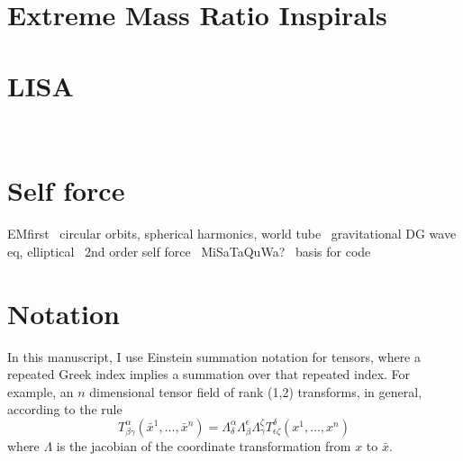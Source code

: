 




\section{Extreme Mass Ratio Inspirals}
\section{LISA}
~\cite{LISA02062017}
~\cite{LISAscienceMarch28_2017}
~\cite{ELISAz}
~\cite{eLISAastrophysicsSelfForce}
\section{Self force}
EMfirst~\cite{dirac1938}
circular orbits, spherical harmonics, world tube~\cite{wardell_vega_thornberg_diener}
gravitational DG wave eq, elliptical~\cite{time_dependent_coordinate_transform}
2nd order self force~\cite{pound2ndOrderSelfForce0}
MiSaTaQuWa?~\cite{minosasakitanaka}
basis for code~\cite{heffernan_ottewil_wardell_modesum_basisForCode}



\section{Notation}
In this manuscript, I use Einstein summation notation for tensors, where a repeated Greek index implies a summation over that repeated index. For example, an $n$ dimensional tensor field of rank (1,2) transforms, in general, according to the rule
\begin{equation}
  T^\alpha_{\beta\gamma}(\bar{x}^1,\ldots,\bar{x}^n)=\Lambda^\alpha_\delta\Lambda^\epsilon_\beta\Lambda^\zeta_\gamma T^\delta_{\epsilon\zeta}(x^1,\ldots,x^n)
\end{equation}
where $\Lambda$ is the jacobian of the coordinate transformation from $x$ to $\bar{x}$. 

